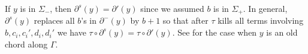 \documentclass[11pt]{amsart}
\makeatletter
\renewenvironment{proof}[1][\proofname] {\par\pushQED{\qed}{\normalfont\bfseries\topsep6\p@\@plus6\p@\relax #1\@addpunct{.} }}{\popQED\endtrivlist\@endpefalse}
\theoremstyle{mystyle}
\newcommand{\<}{\langle}
\renewcommand{\>}{\rangle}
\makeatother
\begin{document}
\begin{proof}
\begin{proof}
       
	
		 If $y$ is in $\Sigma_-$, then $\partial^s(y) = \partial'(y)$ since we assumed $b$ is in $\Sigma_+$. In general, $\partial^s(y)$ replaces all $b$'s in $\partial^-(y)$ by $b + 1$ so that after $\tau$ kills all terms involving $b, c_i, c_i', d_i, d_i'$ we have $\tau \circ \partial^s(y) = \tau \circ \partial'(y)$. See  for the case when $y$ is an old chord along $\Gamma$.

         \begin{figure}[h]
            \begin{center}
\begin{tikzpicture}[x=0.75pt,y=0.75pt,yscale=-1,xscale=1]


\end{tikzpicture}
\end{center}
\end{figure}
\end{proof}
\end{proof}
\end{document}
